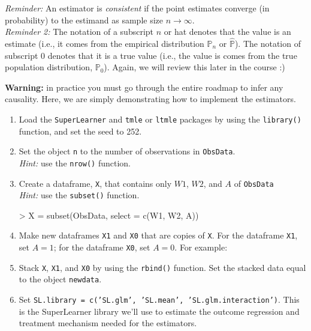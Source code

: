 \documentclass{exam}
\begin{document}
\noindent \emph{Reminder:} An estimator is \emph{consistent} if the point estimates converge (in probability) to the estimand as sample size $n \rightarrow \infty$. \\
\noindent \emph{Reminder 2:} The notation of a subscript $n$ or hat denotes that the value is an estimate (i.e., it comes from the empirical distribution $\mathbb{P}_n$ or $\mathbb{\hat{P}}$). The notation of subscript $0$ denotes that it is a true value (i.e., the value is comes from the true population distribution, $\mathbb{P}_0$). Again, we will review this later in the course :)

\noindent \textbf{Warning:} in practice you must go through the entire roadmap to infer any causality. Here, we are simply demonstrating how to implement the estimators.

\begin{enumerate}
\item Load the \texttt{SuperLearner} and \texttt{tmle} or \texttt{ltmle} packages by using the \texttt{library()} function, and set the seed to 252.
\item Set the object \texttt{n} to the number of observations in \texttt{ObsData}. \\
\textit{Hint:} use the \texttt{nrow()} function.
\item Create a dataframe, \texttt{X}, that contains only $W1$, $W2$, and $A$ of \texttt{ObsData} \\
\textit{Hint:} use the \texttt{subset()} function.
\begin{Schunk}
\begin{Sinput}
> X = subset(ObsData, select = c(W1, W2, A))
\end{Sinput}
\end{Schunk}
\item Make new dataframes \texttt{X1} and \texttt{X0} that are copies of \texttt{X}. For the dataframe \texttt{X1}, set $A = 1$; for the dataframe \texttt{X0}, set $A = 0$. For example:
\begin{Schunk}
\end{Schunk}
\item Stack \texttt{X}, \texttt{X1}, and \texttt{X0} by using the \texttt{rbind()} function. Set the stacked data equal to the object \texttt{newdata}.
\item Set \texttt{SL.library = c('SL.glm', 'SL.mean', 'SL.glm.interaction')}. This is the SuperLearner library we'll use to estimate the outcome regression and treatment mechanism needed for the estimators.

\end{enumerate}
\end{document}
